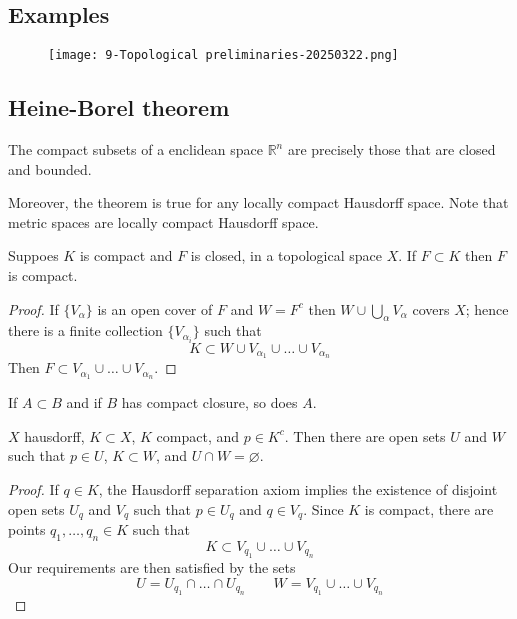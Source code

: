 \subsection{Examples}

\begin{figure}[H]
\centering
\texttt{[image: 9-Topological preliminaries-20250322.png]}
\label{}
\end{figure}

\subsection{Heine-Borel theorem}

\begin{theorem}
The compact subsets of a enclidean space $\mathbb{R}^{n}$ are precisely those that are closed and bounded.
\end{theorem}
Moreover, the theorem is true for any locally compact Hausdorff space. Note that metric spaces are locally compact Hausdorff space.

\begin{theorem}
Suppoes $K$ is compact and $F$ is closed, in a topological space $X$. If $F\subset K$ then $F$ is compact.
\end{theorem}
\begin{proof}
If $\{ V_{\alpha} \}$ is an open cover of $F$ and $W=F^{c}$ then $W\cup \bigcup_{\alpha}V_{\alpha}$ covers $X$; hence there is a finite collection $\{ V_{\alpha _i} \}$ such that
\[
K\subset W\cup V_{\alpha_1}\cup\dots \cup V_{\alpha _n}
\]
Then $F\subset V_{\alpha_1}\cup\dots \cup V_{\alpha _n}$.
\end{proof}

\begin{corollary}
If $A\subset B$ and if $B$ has compact closure, so does $A$.
\end{corollary}
\begin{theorem}
$X$ hausdorff, $K\subset X$, $K$ compact, and $p\in K^{c}$. Then there are open sets $U$ and $W$ such that $p\in U$, $K\subset W$, and $U\cap W=\varnothing$.
\end{theorem}
\begin{proof}
If $q\in K$, the Hausdorff separation axiom implies the existence of disjoint open sets $U_{q}$ and $V_{q}$ such that $p\in U_{q}$ and $q\in V_{q}$. Since $K$ is compact, there are points $q_1,\dots, q_n\in K$ such that
\[
K\subset V_{q_1}\cup\dots \cup V_{q_n}
\]
Our requirements are then satisfied by the sets
\[
U=U_{q_1}\cap\dots \cap U_{q_n}\qquad W=V_{q_1}\cup\dots \cup V_{q_n}
\]
\end{proof}


